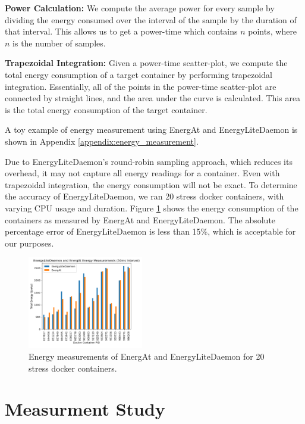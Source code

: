 \documentclass[times, 10pt,twocolumn]{article}
\begin{document}
\textbf{Power Calculation:} We compute the average power for every sample by dividing the energy consumed over the interval of the sample by the duration of that interval. This allows us to get a power-time which contains $n$ points, where $n$ is the number of samples.

\textbf{Trapezoidal Integration:} Given a power-time scatter-plot, we compute the total energy consumption of a target container by performing trapezoidal integration. Essentially, all of the points in the power-time scatter-plot are connected by straight lines, and the area under the curve is calculated. This area is the total energy consumption of the target container. 

A toy example of energy measurement using EnergAt and EnergyLiteDaemon is shown in Appendix \ref{appendix:energy_measurement}.

Due to EnergyLiteDaemon's round-robin sampling approach, which reduces its overhead, it may not capture all energy readings for a container. Even with trapezoidal integration, the energy consumption will not be exact. To determine the accuracy of EnergyLiteDaemon, we ran 20 stress docker containers, with varying CPU usage and duration. Figure \ref{fig:EnergyLiteDaemon_Efficacy} shows the energy consumption of the containers as measured by EnergAt and EnergyLiteDaemon. The absolute percentage error of EnergyLiteDaemon is less than 15\%, which is acceptable for our purposes.

\begin{figure}[ht]
   \centering
   \includegraphics[width=0.45\textwidth]{imgs/EnergyLiteDaemon_Efficacy.png}
   \caption{Energy measurements of EnergAt and EnergyLiteDaemon for 20 stress docker containers.}
   \label{fig:EnergyLiteDaemon_Efficacy}
 \end{figure}

\section{Measurment Study}
\end{document}
